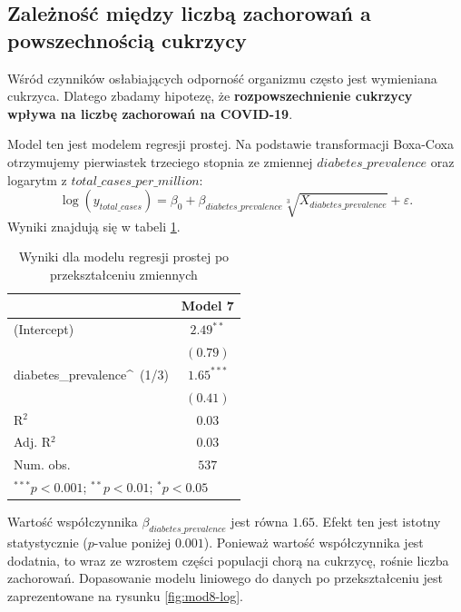 \documentclass[12pt]{mwbk}
\theoremstyle{plain}
\theoremstyle{definition}
\theoremstyle{definition}
\begin{document}
\subsection{Zależność między liczbą zachorowań a powszechnością cukrzycy}

Wśród czynników osłabiających odporność organizmu często jest wymieniana cukrzyca. Dlatego zbadamy hipotezę, że \textbf{rozpowszechnienie cukrzycy wpływa na liczbę zachorowań na COVID-19}.

Model ten jest modelem regresji prostej. Na podstawie transformacji Boxa-Coxa otrzymujemy pierwiastek trzeciego stopnia ze zmiennej $diabetes\_prevalence$ oraz logarytm z $total\_cases\_per\_million$:
$$\log(y_{total\_cases})=\beta_0+\beta_{diabetes\_prevalence}\sqrt[3]{X_{diabetes\_prevalence}}+\varepsilon.$$
Wyniki znajdują się w tabeli \ref{table:mod8-log}.

\begin{table}[htbp]
	\begin{center}
		\begin{tabular}{l c}
			\hline
			& Model 7 \\
			\hline
			(Intercept)                & $2.49^{**}$  \\
			& $(0.79)$     \\
			diabetes\_prevalence\^~(1/3) & $1.65^{***}$ \\
			& $(0.41)$     \\
			\hline
			R$^2$                      & $0.03$       \\
			Adj. R$^2$                 & $0.03$       \\
			Num. obs.                  & $537$        \\
			\hline
			\multicolumn{2}{l}{\scriptsize{$^{***}p<0.001$; $^{**}p<0.01$; $^{*}p<0.05$}}
		\end{tabular}
		\caption{Wyniki dla modelu regresji prostej po przekształceniu zmiennych}
		\label{table:mod8-log}
	\end{center}
\end{table}

Wartość współczynnika $\beta_{diabetes\_prevalence}$ jest równa $1.65$. Efekt ten jest istotny statystycznie ($p$-value poniżej $0.001$). Ponieważ wartość współczynnika jest dodatnia, to wraz ze wzrostem części populacji chorą na cukrzycę, rośnie liczba zachorowań. Dopasowanie modelu liniowego do danych po przekształceniu jest zaprezentowane na rysunku \ref{fig:mod8-log}.

\newpage
\end{document}
